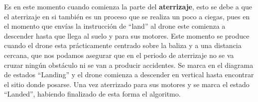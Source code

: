 \hspace{1cm} Es en este momento cuando comienza la parte del \textbf{aterrizaje}, esto se debe a que el aterrizaje en si tambi\'en es un proceso que se realiza un poco a ciegas, pues en el momento que env\'ias la instrucci\'on de "`land"' al drone este comienza a descender hasta que llega al suelo y para sus motores. Este momento se produce cuando el drone esta pr\'acticamente centrado sobre la baliza y a una distancia cercana, que nos podamos asegurar que en el periodo de aterrizaje no se va cruzar ning\'un obst\'aculo ni se van a producir accidentes. Se marca en el diagrama de estados "`Landing"' y el drone comienza a descender en vertical hasta encontrar el sitio donde posarse. Una vez aterrizado para sus motores y se marca el estado "`Landed"', habiendo finalizado de esta forma el algoritmo. 


